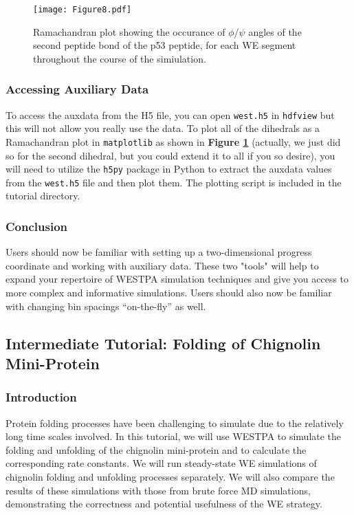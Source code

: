 \begin{figure}[t]
\texttt{[image: Figure8.pdf]}
\vspace{-0.75cm}
\caption{Ramachandran plot showing the occurance of $\phi$/$\psi$ angles of the second peptide bond of the p53 peptide, for each WE segment throughout the course of the simiulation.}
\label{fig:p53-rama}
\vspace{-0.25cm}
\end{figure}

\subsubsection{Accessing Auxiliary Data}

To access the auxdata from the H5 file, you can open \verb|west.h5| in \verb|hdfview| but this will not allow you really use the data. 
To plot all of the dihedrals as a Ramachandran plot in \verb|matplotlib| as shown in \textbf{Figure \ref{fig:p53-rama}} (actually, we just did so for the second dihedral, but you could extend it to all if you so desire), you will need to utilize the \verb|h5py| package in Python to extract the auxdata values from the \verb|west.h5| file and then plot them. 
The plotting script is included in the tutorial directory.

\subsubsection{Conclusion}

Users should now be familiar with setting up a two-dimensional progress coordinate and working with auxiliary data. 
These two "tools" will help to expand your repertoire of WESTPA simulation techniques and give you access to more complex and informative simulations. 
Users should also now be familiar with changing bin spacings “on-the-fly” as well. 

\subsection{Intermediate Tutorial: Folding of Chignolin Mini-Protein}
\label{tut:chig-int}

\subsubsection{Introduction}

Protein folding processes have been challenging to simulate due to the relatively long time scales involved. 
In this tutorial, we will use WESTPA to simulate the folding and unfolding of the chignolin mini-protein and to calculate the corresponding rate constants. 
We will run steady-state WE simulations of chignolin folding and unfolding processes separately. 
We will also compare the results of these simulations with those from brute force MD simulations, demonstrating the correctness and potential usefulness of the WE strategy. 
 
